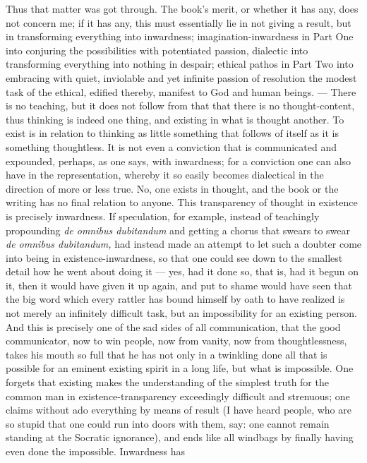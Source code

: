 \documentclass[12pt,a4paper,openany]{book}
\newcommand{\opage}[1]{\marginnote{\footnotesize\textit{[#1]}}}
\begin{document}
Thus that matter was got through. The book's merit, or whether it has any, does not
concern me; if it has any, this must essentially lie in not giving a result, but in
transforming everything into inwardness; imagination-inwardness in Part One into
conjuring the possibilities with potentiated passion, dialectic into transforming
everything into nothing in despair; ethical pathos in Part Two into embracing with
quiet, inviolable and yet infinite passion of resolution the modest task of the
ethical, edified thereby, manifest to God and human beings. --- There is no teaching,
but it does not follow from that that there is no thought-content, thus thinking is
indeed one thing, and existing in what is thought another. To exist is in relation to
thinking as little something that follows of itself as it is something thoughtless. It
is not even a conviction that is communicated and expounded, perhaps, as one says,
with inwardness; for a conviction one can also have in the representation, whereby it
so easily becomes dialectical in the direction of more or less true. No, one exists in
thought, and the book or the writing has no final relation to anyone. This
transparency of thought in existence is precisely inwardness. If speculation, for
example, instead of teachingly propounding \textit{de omnibus dubitandum} and getting a
\setcounter{footnote}{0}%
\opage{192}chorus that swears to swear \textit{de omnibus dubitandum,} had instead made an
attempt to let such a doubter come into being in existence-inwardness, so that one
could see down to the smallest detail how he went about doing it --- yes, had it done
so, that is, had it begun on it, then it would have given it up again, and put to shame
would have seen that the big word which every rattler has bound himself by oath to
have realized is not merely an infinitely difficult task, but an impossibility for an
existing person. And this is precisely one of the sad sides of all communication, that
the good communicator, now to win people, now from vanity, now from thoughtlessness,
takes his mouth so full that he has not only in a twinkling done all that is possible
for an eminent existing spirit in a long life, but what is impossible. One forgets that
existing makes the understanding of the simplest truth for the common man in
existence-transparency exceedingly difficult and strenuous; one claims without ado
everything by means of result (I have heard people, who are so stupid that one could
run into doors with them, say: one cannot remain standing at the Socratic ignorance),
and ends like all windbags by finally having even done the impossible. Inwardness has
\end{document}

